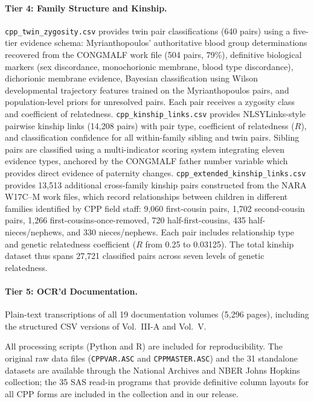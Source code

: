 \documentclass[12pt]{article}
\begin{document}
\paragraph{Tier 4: Family Structure and Kinship.}
\texttt{cpp\_twin\_zygosity.csv} provides twin pair classifications (640 pairs) using a five-tier evidence schema: Myrianthopoulos' authoritative blood group determinations recovered from the CONGMALF work file (504 pairs, 79\%), definitive biological markers (sex discordance, monochorionic membrane, blood type discordance), dichorionic membrane evidence, Bayesian classification using Wilson developmental trajectory features trained on the Myrianthopoulos pairs, and population-level priors for unresolved pairs. Each pair receives a zygosity class and coefficient of relatedness. \texttt{cpp\_kinship\_links.csv} provides NLSYLinks-style pairwise kinship links (14,208 pairs) with pair type, coefficient of relatedness ($R$), and classification confidence for all within-family sibling and twin pairs. Sibling pairs are classified using a multi-indicator scoring system integrating eleven evidence types, anchored by the CONGMALF father number variable which provides direct evidence of paternity changes. \texttt{cpp\_extended\_kinship\_links.csv} provides 13,513 additional cross-family kinship pairs constructed from the NARA W17C--M work files, which record relationships between children in different families identified by CPP field staff: 9,060 first-cousin pairs, 1,702 second-cousin pairs, 1,266 first-cousins-once-removed, 720 half-first-cousins, 435 half-nieces/nephews, and 330 nieces/nephews. Each pair includes relationship type and genetic relatedness coefficient ($R$ from 0.25 to 0.03125). The total kinship dataset thus spans 27,721 classified pairs across seven levels of genetic relatedness.

\paragraph{Tier 5: OCR'd Documentation.}
Plain-text transcriptions of all 19 documentation volumes (5,296 pages), including the structured CSV versions of Vol.\ III-A and Vol.\ V.

\medskip
All processing scripts (Python and R) are included for reproducibility. The original raw data files (\texttt{CPPVAR.ASC} and \texttt{CPPMASTER.ASC}) and the 31 standalone datasets are available through the National Archives and NBER Johns Hopkins collection; the 35 SAS read-in programs that provide definitive column layouts for all CPP forms are included in the collection and in our release.
\end{document}
